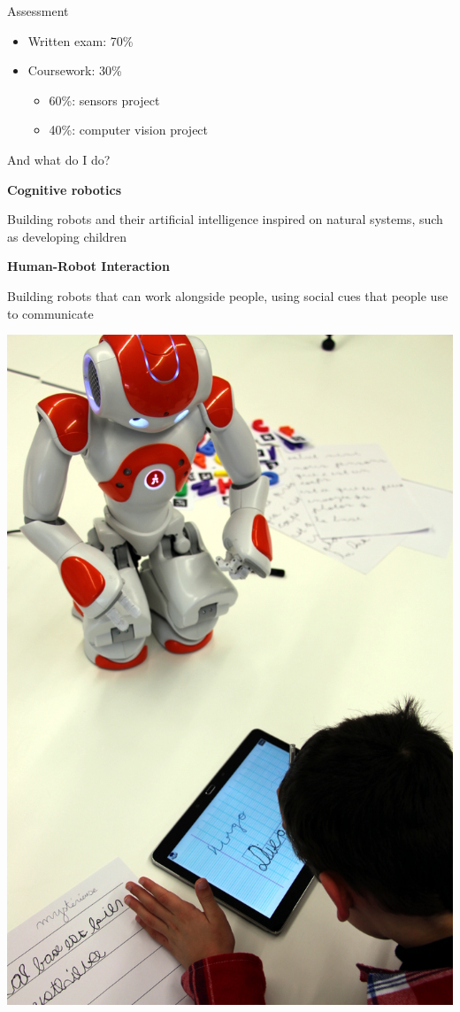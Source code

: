 \documentclass[compress]{beamer}
\begin{document}
\begin{frame}{Assessment}

    \large
    \begin{itemize}
        \item Written exam: 70\%
        \item Coursework: 30\%
            \begin{itemize}
                \item 60\%: sensors project
                \item 40\%: computer vision project
            \end{itemize}
    \end{itemize}

\end{frame}


\begin{frame}{And what do I do?}

\begin{multicols}{2}

    \textbf{Cognitive robotics}

  Building robots and their artificial intelligence inspired on natural
  systems, such as developing children

    \textbf{Human-Robot Interaction}

  Building robots that can work alongside people, using social cues that
  people use to communicate

    \begin{center}
        \includegraphics[width=0.8\linewidth]{cowriter}
    \end{center}

\end{multicols}
\end{frame}
\end{document}
